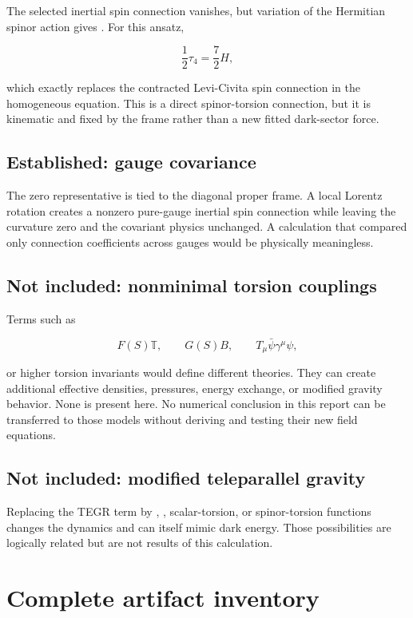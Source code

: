 \documentclass[11pt]{article}
\begin{document}
The selected inertial spin connection vanishes, but variation of the Hermitian spinor action gives \texttt{}. For this ansatz,

\[
\frac12\tau_4=\frac72H,
\]

which exactly replaces the contracted Levi-Civita spin connection in the homogeneous equation. This is a direct spinor-torsion connection, but it is kinematic and fixed by the frame rather than a new fitted dark-sector force.

\subsection{Established: gauge covariance}

The zero representative is tied to the diagonal proper frame. A local Lorentz rotation creates a nonzero pure-gauge inertial spin connection while leaving the curvature zero and the covariant physics unchanged. A calculation that compared only connection coefficients across gauges would be physically meaningless.

\subsection{Not included: nonminimal torsion couplings}

Terms such as

\[
F(S)\mathbb T,
\qquad
G(S)B,
\qquad
T_\mu\bar\psi\gamma^\mu\psi,
\]

or higher torsion invariants would define different theories. They can create additional effective densities, pressures, energy exchange, or modified gravity behavior. None is present here. No numerical conclusion in this report can be transferred to those models without deriving and testing their new field equations.

\subsection{Not included: modified teleparallel gravity}

Replacing the TEGR term by \texttt{}, \texttt{}, scalar-torsion, or spinor-torsion functions changes the dynamics and can itself mimic dark energy. Those possibilities are logically related but are not results of this calculation.

\section{Complete artifact inventory}
\end{document}
